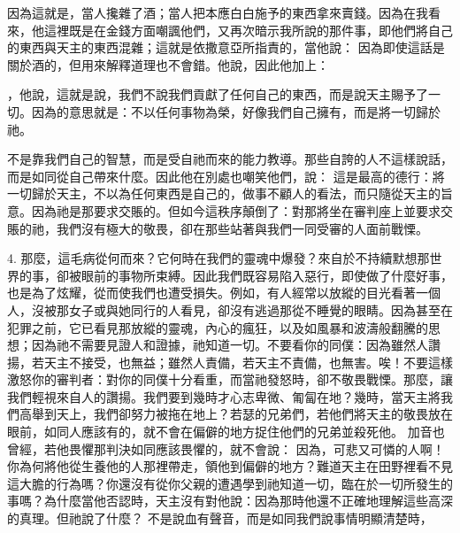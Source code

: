 因為這就是，當人攙雜了酒；當人把本應白白施予的東西拿來賣錢。因為在我看來，他這裡既是在金錢方面嘲諷他們，又再次暗示我所說的那件事，即他們將自己的東西與天主的東西混雜；這就是依撒意亞所指責的，當他說：  因為即使這話是關於酒的，但用來解釋道理也不會錯。他說，因此他加上：\par

，他說，這就是說，我們不說我們貢獻了任何自己的東西，而是說天主賜予了一切。因為的意思就是：不以任何事物為榮，好像我們自己擁有，而是將一切歸於祂。\par

不是靠我們自己的智慧，而是受自祂而來的能力教導。那些自誇的人不這樣說話，而是如同從自己帶來什麼。因此他在別處也嘲笑他們，說：  這是最高的德行：將一切歸於天主，不以為任何東西是自己的，做事不顧人的看法，而只隨從天主的旨意。因為祂是那要求交賬的。但如今這秩序顛倒了：對那將坐在審判座上並要求交賬的祂，我們沒有極大的敬畏，卻在那些站著與我們一同受審的人面前戰慄。\par

4. 那麼，這毛病從何而來？它何時在我們的靈魂中爆發？來自於不持續默想那世界的事，卻被眼前的事物所束縛。因此我們既容易陷入惡行，即使做了什麼好事，也是為了炫耀，從而使我們也遭受損失。例如，有人經常以放縱的目光看著一個人，沒被那女子或與她同行的人看見，卻沒有逃過那從不睡覺的眼睛。因為甚至在犯罪之前，它已看見那放縱的靈魂，內心的瘋狂，以及如風暴和波濤般翻騰的思想；因為祂不需要見證人和證據，祂知道一切。不要看你的同僕：因為雖然人讚揚，若天主不接受，也無益；雖然人責備，若天主不責備，也無害。唉！不要這樣激怒你的審判者：對你的同僕十分看重，而當祂發怒時，卻不敬畏戰慄。那麼，讓我們輕視來自人的讚揚。我們要到幾時才心志卑微、匍匐在地？幾時，當天主將我們高舉到天上，我們卻努力被拖在地上？若瑟的兄弟們，若他們將天主的敬畏放在眼前，如同人應該有的，就不會在偏僻的地方捉住他們的兄弟並殺死他。 加音也曾經，若他畏懼那判決如同應該畏懼的，就不會說：  因為，可悲又可憐的人啊！你為何將他從生養他的人那裡帶走，領他到偏僻的地方？難道天主在田野裡看不見這大膽的行為嗎？你還沒有從你父親的遭遇學到祂知道一切，臨在於一切所發生的事嗎？為什麼當他否認時，天主沒有對他說：因為那時他還不正確地理解這些高深的真理。但祂說了什麼？ 不是說血有聲音，而是如同我們說事情明顯清楚時，\par

